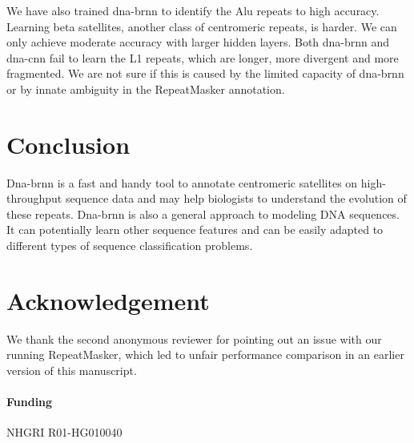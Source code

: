 \documentclass{bioinfo}
\begin{document}
We have also trained dna-brnn to identify the Alu repeats to high accuracy.
Learning beta satellites, another class of centromeric repeats, is harder. We
can only achieve moderate accuracy with larger hidden layers. Both dna-brnn
and dna-cnn fail to learn the L1 repeats, which are longer, more divergent and
more fragmented. We are not sure if this is caused by the limited capacity of
dna-brnn or by innate ambiguity in the RepeatMasker annotation.

\section{Conclusion}

Dna-brnn is a fast and handy tool to annotate centromeric satellites on
high-throughput sequence data and may help biologists to understand the
evolution of these repeats. Dna-brnn is also a general approach to modeling DNA
sequences. It can potentially learn other sequence features and can be easily
adapted to different types of sequence classification problems.

\section*{Acknowledgement}

We thank the second anonymous reviewer for pointing out an issue with our
running RepeatMasker, which led to unfair performance comparison in an earlier
version of this manuscript.

\paragraph{Funding\textcolon} NHGRI R01-HG010040


\end{document}
